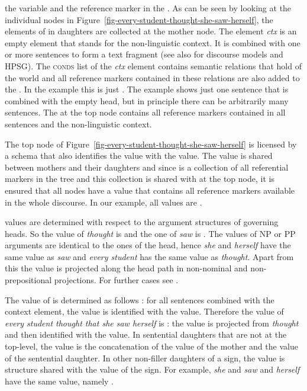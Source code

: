 \documentclass[output=paper,biblatex,babelshorthands,newtxmath,draftmode,colorlinks,citecolor=brown]{langscibook}
\begin{document}
the variable  and the reference marker  in the \listlu. As can be seen by looking at the
individual nodes in Figure~\ref{fig-every-student-thought-she-saw-herself}, the elements of \listlu
in daughters are collected at the mother node. The element \emph{ctx} is an empty element that
stands for the non-linguistic context. It is combined with one or more sentences to form a text
fragment (see also  for discourse models and HPSG). The \textsc{conds}
list of the \emph{ctx} element contains semantic relations that hold of the world and all reference
markers contained in these relations are also added to the \listlul. In the example this is just
. The example shows just one sentence that is combined with the empty head, but in principle
there can be arbitrarily many sentences. The \listlul at the top node contains all reference markers contained in
all sentences and the non-linguistic context. 

The top node of Figure~\ref{fig-every-student-thought-she-saw-herself} is licensed by a schema that
also identifies the \listu value with the \listlu value. The \listu value is shared between mothers
and their daughters and since \listlu is a collection of all referential markers in the tree and
this collection is shared with \listu at the top node, it is ensured that all nodes have a \listu
value that contains all reference markers available in the whole discourse. In our example, all
\listu values are .

\lista values are determined with respect to the argument structures of governing heads. So the
\lista value of \emph{thought} is  and the one of \emph{saw} is
. The \lista values of NP or PP arguments are identical to the ones of the head,
hence \emph{she} and \emph{herself} have the same \lista value as \emph{saw} and \emph{every
  student} has the same \lista value as \emph{thought}. Apart from this the \lista value is
projected along the head path in non-nominal and non-prepositional projections. For further cases
see \citet[]{Branco2002a}.

The value of \listz is determined as follows \citep[]{Branco2002a}: for all sentences combined with the context element,
the \listz value is identified with the \lista value. Therefore the \listz value of \emph{every
  student thought that she saw herself} is : the \lista value is
projected from \emph{thought} and then identified with the \listz value. In sentential daughters
that are not at the top-level, the \listz value is the concatenation of the \listz value of the
mother and the \lista value of the sentential daughter. In other non-filler daughters of a sign, the
\listz value is structure shared with the \listz value of the sign. For example, \emph{she} and
\emph{saw} and \emph{herself} have the same \listz value, namely .
\end{document}
